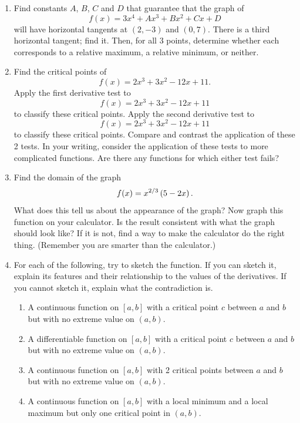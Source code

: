 \begin{enumerate}
\item  Find constants $A$, $B$, $C$ and $D$ that guarantee that the graph of $$f(x) = 3x^4  + Ax^3  + Bx^2  + Cx + D$$ will have horizontal tangents at $(2, -3)$ and $(0, 7)$.  There is a third horizontal tangent; find it.  Then, for all 3 points, determine whether each corresponds to a relative maximum, a relative minimum, or neither.  \cite{SBS}

\item  Find the critical points of $$f(x) = 2x^3  + 3x^2  - 12x + 11.$$  Apply the first derivative test to $$f(x) = 2x^3  + 3x^2  - 12x + 11$$ to classify these critical points.  Apply the second derivative test to $$f(x) = 2x^3  + 3x^2  - 12x + 11$$ to classify these critical points.  Compare and contrast the application of these 2 tests.  In your writing, consider the application of these tests to more complicated functions.  Are there any functions for which either test fails?

\item  Find the domain of the graph $$f(x) = x^{{2 \mathord{\left/ {\vphantom {2 3}} \right. \kern-\nulldelimiterspace} 3}} \left( {5 - 2x} \right).$$  What does this tell us about the appearance of the graph?  Now graph this function on your calculator.  Is the result consistent with what the graph should look like?  If it is not, find a way to make the calculator do the right thing.  (Remember you are smarter than the calculator.)

\item  For each of the following, try to sketch the function.  If you can sketch it, explain its features and their relationship to the values of the derivatives.  If you cannot sketch it, explain what the contradiction is.\begin{enumerate}
\item A continuous function on $[a, b]$ with a critical point $c$ between $a$ and $b$ but with no extreme value on $(a, b)$.		
\item A differentiable function on $[a, b]$ with a critical point $c$ between $a$ and $b$ but with no extreme value on $(a, b)$.
\item A continuous function on $[a, b]$ with 2 critical points between $a$ and $b$ but with no extreme value on $(a, b)$. 	
\item A continuous function on $[a, b]$ with a local minimum and a local maximum but only one critical point in $(a, b)$.  \cite{EP} \end{enumerate}


\end{enumerate}
